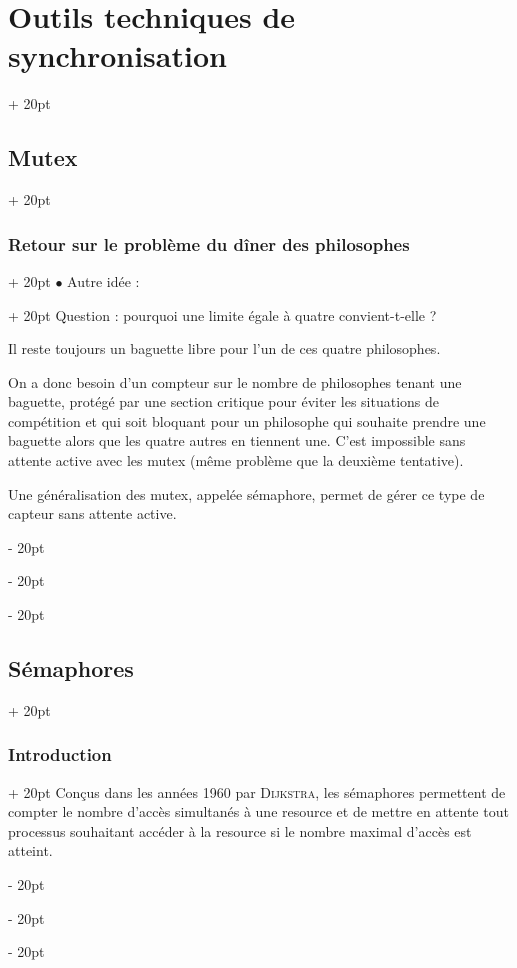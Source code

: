 \documentclass[a4paper, 12pt, twoside]{article}
\newcommand{\ind}[1][20pt]{\advance\leftskip + #1}
\newcommand{\deind}[1][20pt]{\advance\leftskip - #1}
\newenvironment{indt}[2][20pt]{#2 \par \ind[#1]}{\par \deind} %
\begin{document}
\begin{indt}{\section{Outils techniques de synchronisation}}
\begin{indt}{\subsection{Mutex}}
\begin{indt}{\subsubsection{Retour sur le problème du dîner des philosophes}}
\begin{indt}{$\bullet$ Autre idée :}
                    Question : pourquoi une limite égale à quatre convient-t-elle ?

                    Il reste toujours un baguette libre pour l'un de ces quatre philosophes.

                    \begin{center}
                    \end{center}

                    On a donc besoin d'un compteur sur le nombre de philosophes tenant une baguette, protégé par une section critique pour éviter les situations de compétition et qui soit bloquant pour un philosophe qui souhaite prendre une baguette alors que les quatre autres en tiennent une.
                    C'est impossible sans attente active avec les mutex (même problème que la deuxième tentative).

                    Une généralisation des mutex, appelée sémaphore, permet de gérer ce type de capteur sans attente active.
                \end{indt}
            \end{indt}
        \end{indt}

        \vspace{12pt}
        
        \begin{indt}{\subsection{Sémaphores}}
            \begin{indt}{\subsubsection{Introduction}}
                Conçus dans les années 1960 par \textsc{Dijkstra}, les sémaphores permettent de compter le nombre d'accès simultanés à une resource et de mettre en attente tout processus souhaitant accéder à la resource si le nombre maximal d'accès est atteint.


\end{indt}
\end{indt}
\end{indt}
\end{document}
